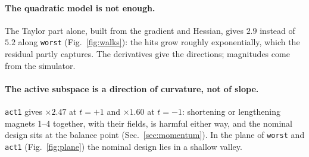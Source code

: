 \documentclass[11pt,a4paper]{article}
\begin{document}
\paragraph{The quadratic model is not enough.}
The Taylor part alone, built from the gradient and Hessian, gives $2.9$ instead of $5.2$ along
\texttt{worst} (Fig.~\ref{fig:walks}): the hits grow roughly exponentially, which the residual
partly captures. The derivatives give the directions; magnitudes come from the simulator.

\paragraph{The active subspace is a direction of curvature, not of slope.}
\texttt{act1} gives $\times2.47$ at $t=+1$ and $\times1.60$ at $t=-1$: shortening or lengthening
magnets 1--4 together, with their fields, is harmful either way, and the nominal design sits at
the balance point (Sec.~\ref{sec:momentum}). In the plane of \texttt{worst} and \texttt{act1}
(Fig.~\ref{fig:plane}) the nominal design lies in a shallow valley.
\end{document}
